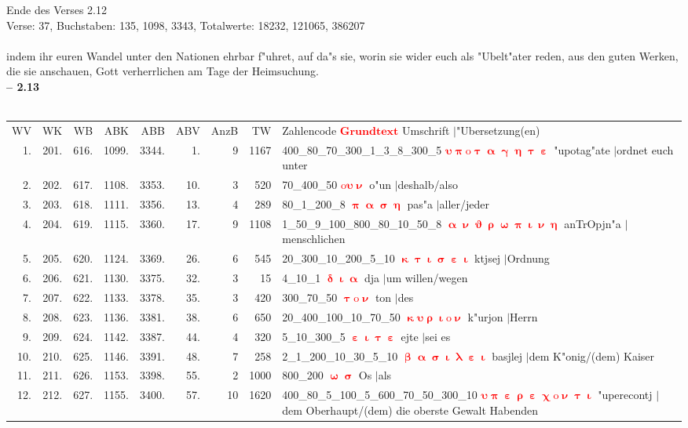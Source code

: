 \documentclass[a4paper,10pt,landscape]{article}
\begin{document}
Ende des Verses 2.12\\
Verse: 37, Buchstaben: 135, 1098, 3343, Totalwerte: 18232, 121065, 386207\\
\\
indem ihr euren Wandel unter den Nationen ehrbar f"uhret, auf da"s sie, worin sie wider euch als "Ubelt"ater reden, aus den guten Werken, die sie anschauen, Gott verherrlichen am Tage der Heimsuchung.\\
\newpage 
{\bf -- 2.13}\\
\medskip \\
\begin{tabular}{rrrrrrrrp{120mm}}
WV&WK&WB&ABK&ABB&ABV&AnzB&TW&Zahlencode \textcolor{red}{$\boldsymbol{Grundtext}$} Umschrift $|$"Ubersetzung(en)\\
1.&201.&616.&1099.&3344.&1.&9&1167&400\_80\_70\_300\_1\_3\_8\_300\_5 \textcolor{red}{$\boldsymbol{\upsilon\uppi\mathrm{o}\uptau\upalpha\upgamma\upeta\uptau\upepsilon}$} "upotag"ate $|$ordnet euch unter\\
2.&202.&617.&1108.&3353.&10.&3&520&70\_400\_50 \textcolor{red}{$\boldsymbol{\mathrm{o}\upsilon\upnu}$} o"un $|$deshalb/also\\
3.&203.&618.&1111.&3356.&13.&4&289&80\_1\_200\_8 \textcolor{red}{$\boldsymbol{\uppi\upalpha\upsigma\upeta}$} pas"a $|$aller/jeder\\
4.&204.&619.&1115.&3360.&17.&9&1108&1\_50\_9\_100\_800\_80\_10\_50\_8 \textcolor{red}{$\boldsymbol{\upalpha\upnu\upvartheta\uprho\upomega\uppi\upiota\upnu\upeta}$} anTrOpjn"a $|$menschlichen\\
5.&205.&620.&1124.&3369.&26.&6&545&20\_300\_10\_200\_5\_10 \textcolor{red}{$\boldsymbol{\upkappa\uptau\upiota\upsigma\upepsilon\upiota}$} ktjsej $|$Ordnung\\
6.&206.&621.&1130.&3375.&32.&3&15&4\_10\_1 \textcolor{red}{$\boldsymbol{\updelta\upiota\upalpha}$} dja $|$um willen/wegen\\
7.&207.&622.&1133.&3378.&35.&3&420&300\_70\_50 \textcolor{red}{$\boldsymbol{\uptau\mathrm{o}\upnu}$} ton $|$des\\
8.&208.&623.&1136.&3381.&38.&6&650&20\_400\_100\_10\_70\_50 \textcolor{red}{$\boldsymbol{\upkappa\upsilon\uprho\upiota\mathrm{o}\upnu}$} k"urjon $|$Herrn\\
9.&209.&624.&1142.&3387.&44.&4&320&5\_10\_300\_5 \textcolor{red}{$\boldsymbol{\upepsilon\upiota\uptau\upepsilon}$} ejte $|$sei es\\
10.&210.&625.&1146.&3391.&48.&7&258&2\_1\_200\_10\_30\_5\_10 \textcolor{red}{$\boldsymbol{\upbeta\upalpha\upsigma\upiota\uplambda\upepsilon\upiota}$} basjlej $|$dem K"onig/(dem) Kaiser\\
11.&211.&626.&1153.&3398.&55.&2&1000&800\_200 \textcolor{red}{$\boldsymbol{\upomega\upsigma}$} Os $|$als\\
12.&212.&627.&1155.&3400.&57.&10&1620&400\_80\_5\_100\_5\_600\_70\_50\_300\_10 \textcolor{red}{$\boldsymbol{\upsilon\uppi\upepsilon\uprho\upepsilon\upchi\mathrm{o}\upnu\uptau\upiota}$} "uperecontj $|$dem Oberhaupt/(dem) die oberste Gewalt Habenden\\
\end{tabular}\medskip \\
\end{document}
